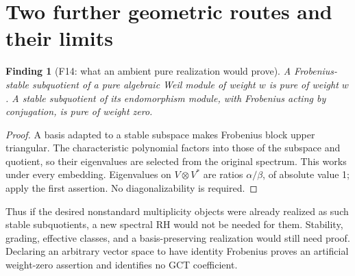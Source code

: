\documentclass[11pt,a4paper]{article}
\newcommand{\fid}[1]{\textsf{#1}}\newcommand{\gate}[1]{\textsf{#1}}
\theoremstyle{named}\newtheorem{finding}{Finding}[section]
\theoremstyle{definition}\newtheorem{definition}[finding]{Definition}
\theoremstyle{remark}\newtheorem{remark}[finding]{Remark}
\begin{document}
\section{Two further geometric routes and their limits}\label{sec:other}
\begin{finding}[\fid{F14}: what an ambient pure realization would prove]\label{f:sub}
A Frobenius-stable subquotient of a pure algebraic Weil module of weight $w$ is pure of weight $w$. A stable subquotient of its endomorphism module, with Frobenius acting by conjugation, is pure of weight zero.
\end{finding}
\begin{proof}
A basis adapted to a stable subspace makes Frobenius block upper triangular. The characteristic polynomial factors into those of the subspace and quotient, so their eigenvalues are selected from the original spectrum. This works under every embedding. Eigenvalues on $V\otimes V^*$ are ratios $\alpha/\beta$, of absolute value 1; apply the first assertion. No diagonalizability is required.
\end{proof}
Thus if the desired nonstandard multiplicity objects were already realized as such stable subquotients, a new spectral RH would not be needed for them. Stability, grading, effective classes, and a basis-preserving realization would still need proof. Declaring an arbitrary vector space to have identity Frobenius proves an artificial weight-zero assertion and identifies no GCT coefficient.
\end{document}
